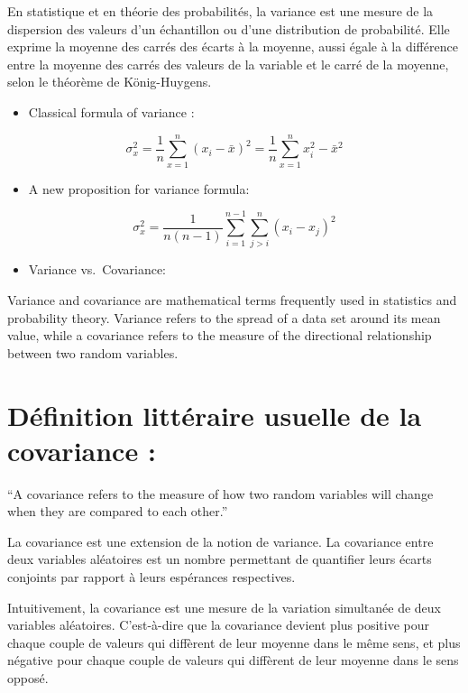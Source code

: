 \documentclass[
]{report}
\providecommand{\tightlist}{%
  \setlength{\itemsep}{0pt}\setlength{\parskip}{0pt}}
\begin{document}
En statistique et en théorie des probabilités, la variance est une mesure de la dispersion des valeurs d'un échantillon ou d'une distribution de probabilité. Elle exprime la moyenne des carrés des écarts à la moyenne, aussi égale à la différence entre la moyenne des carrés des valeurs de la variable et le carré de la moyenne, selon le théorème de König-Huygens.

\begin{itemize}
\tightlist
\item
  Classical formula of variance :
\end{itemize}

\[\sigma^2_x=\frac{1}{n}\sum_{x=1}^{n}(x_i - \bar{x})^2 = \frac{1}{n}\sum_{x=1}^{n}x_i^2 - \bar{x}^2 \]

\begin{itemize}
\tightlist
\item
  A new proposition for variance formula\citep{Heffernan}:
\end{itemize}

\[\sigma^2_x= \frac{1}{n(n-1)}\sum_{i=1}^{n-1}\sum_{j>i}^{n}(x_i-x_j)^2\]

\begin{itemize}
\tightlist
\item
  Variance vs.~Covariance:
\end{itemize}

Variance and covariance are mathematical terms frequently used in statistics and probability theory. Variance refers to the spread of a data set around its mean value, while a covariance refers to the measure of the directional relationship between two random variables.

\hypertarget{duxe9finition-littuxe9raire-usuelle-de-la-covariance}{%
\section{Définition littéraire usuelle de la covariance :}\label{duxe9finition-littuxe9raire-usuelle-de-la-covariance}}

``A covariance refers to the measure of how two random variables will change when they are compared to each other.''

La covariance est une extension de la notion de variance. La covariance entre deux variables aléatoires est un nombre permettant de quantifier leurs écarts conjoints par rapport à leurs espérances respectives.

Intuitivement, la covariance est une mesure de la variation simultanée de deux variables aléatoires. C'est-à-dire que la covariance devient plus positive pour chaque couple de valeurs qui diffèrent de leur moyenne dans le même sens, et plus négative pour chaque couple de valeurs qui diffèrent de leur moyenne dans le sens opposé.
\end{document}
